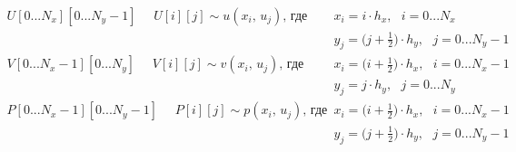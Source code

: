 \documentclass[12pt]{article}
\newcommand{\VovaSquare}[3]{\draw[thick] (#1-0.5*#3,#2-0.5*#3) --++ (#3,0) --++ (0,#3) --++ (-#3,0) -- cycle;}
\newcommand{\VovaCircle}[3]{\draw[thick] (#1,#2) circle (#3 cm);}
\newcommand{\VovaDot}[3]{\filldraw[thick] (#1,#2) circle (#3 cm);}
\newcommand{\VovaCross}[3]{\draw[thick] (#1,#2) --++ (#3,#3); \draw[thick] (#1,#2) --++ (-#3,#3); \draw[thick] (#1,#2) --++ (#3,-#3); \draw[thick] (#1,#2) --++ (-#3,-#3); }
\newcommand{\VovaSize}{0.4}
\begin{document}

\vspace{1cm}
\begin{align*}
U[0...N_x][0...N_y-1] \,\,\,\,\,\,\,\,  U[i][j] \sim u(x_i, \, u_j)\text{, где } 
&x_i = i \cdot h_x, \,\,\,\, i = 0 ... N_x \\
&y_j = \Big(j + \frac{1}{2}\Big) \cdot h_y, \,\,\,\, j = 0 ... N_y - 1 \\  
V[0...N_x-1][0...N_y] \,\,\,\,\,\,\,\,  V[i][j] \sim v(x_i, \, u_j)\text{, где } 
&x_i = \Big(i + \frac{1}{2}\Big) \cdot h_x, \,\,\,\, i = 0 ... N_x -1  \\
&y_j = j \cdot h_y, \,\,\,\, j = 0 ... N_y \\ 
P[0...N_x-1][0...N_y-1] \,\,\,\,\,\,\,\,  P[i][j] \sim p(x_i, \, u_j)\text{, где } 
&x_i = \Big(i + \frac{1}{2}\Big) \cdot h_x, \,\,\,\, i = 0 ... N_x - 1 \\
&y_j = \Big(j + \frac{1}{2}\Big) \cdot h_y, \,\,\,\, j = 0 ... N_y - 1 \\ 
\end{align*}
\end{document}
